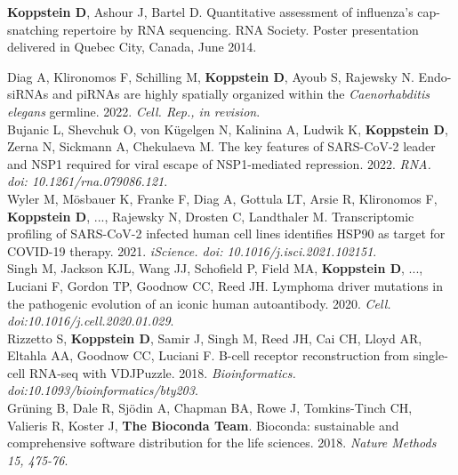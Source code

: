 \documentclass[10pt,a4paper]{article}
\begin{document}
{\noindent \textbf{Koppstein D}, Ashour J, Bartel D. Quantitative assessment of influenza's cap-snatching repertoire by RNA sequencing. RNA Society. Poster presentation delivered in Quebec City, Canada, June 2014.}

\newpage


{\noindent Diag A, Klironomos F, Schilling M, \textbf{Koppstein D}, Ayoub S, Rajewsky N. Endo-siRNAs and piRNAs are highly spatially organized within the \textit{Caenorhabditis elegans} germline. 2022. \textit{Cell. Rep., in revision}. \vspace{0.5em} \\
{\noindent Bujanic L, Shevchuk O, von Kügelgen N, Kalinina A, Ludwik K, \textbf{Koppstein D}, Zerna N, Sickmann A, Chekulaeva M. The key features of SARS-CoV-2 leader and NSP1 required for viral escape of NSP1-mediated repression. 2022. \textit{RNA. doi: 10.1261/rna.079086.121}. \vspace{0.5em} \\ 
{\noindent Wyler M, Mösbauer K, Franke F, Diag A, Gottula LT, Arsie R, Klironomos F, \textbf{Koppstein D}, ..., Rajewsky N, Drosten C, Landthaler M. Transcriptomic profiling of SARS-CoV-2 infected human cell lines identifies HSP90 as target for COVID-19 therapy. 2021. \textit{iScience. doi: 10.1016/j.isci.2021.102151}. \vspace{0.5em} \\
{\noindent Singh M, Jackson KJL, Wang JJ, Schofield P, Field MA, \textbf{Koppstein D}, ..., Luciani F, Gordon TP, Goodnow CC, Reed JH. Lymphoma driver mutations in the pathogenic evolution of an iconic human autoantibody. 2020. \textit{Cell. doi:10.1016/j.cell.2020.01.029}. \vspace{0.5em} \\
{\noindent Rizzetto S, \textbf{Koppstein D}, Samir J, Singh M, Reed JH, Cai CH, Lloyd AR, Eltahla AA, Goodnow CC, Luciani F. B-cell receptor reconstruction from single-cell RNA-seq with VDJPuzzle. 2018. \textit{Bioinformatics. doi:10.1093/bioinformatics/bty203}. \vspace{0.5em} \\
{\noindent Grüning B, Dale R, Sjödin A, Chapman BA, Rowe J, Tomkins-Tinch CH, Valieris R, Koster J, \textbf{The Bioconda Team}. Bioconda: sustainable and comprehensive software distribution for the life sciences. 2018. \textit{Nature Methods 15, 475-76}.} \vspace{0.4em} \\
}}}}}
\end{document}
